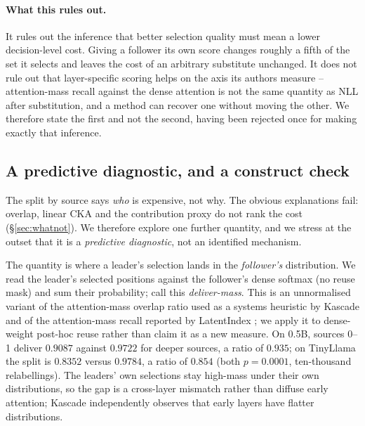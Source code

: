 \documentclass[10pt]{article}
\begin{document}
\paragraph{What this rules out.} It rules out the inference that better
selection quality must mean a lower decision-level cost. Giving a follower its
own score changes roughly a fifth of the set it selects and leaves the cost of
an arbitrary substitute unchanged. It does not rule out that layer-specific
scoring helps on the axis its authors measure -- attention-mass recall
against the dense attention is not the same quantity as NLL after
substitution, and a method can recover one without moving the other. We
therefore state the first and not the second, having been rejected once for
making exactly that inference.

\subsection{A predictive diagnostic, and a construct check}
\label{sec:mechanism}

The split by source says \emph{who} is expensive, not why. The obvious
explanations fail: overlap, linear CKA and the contribution proxy do not rank
the cost (\S\ref{sec:whatnot}). We therefore explore one further quantity, and
we stress at the outset that it is a \emph{predictive diagnostic}, not an
identified mechanism.

The quantity is where a leader's selection lands in the \emph{follower's}
distribution. We read the leader's selected positions against the follower's
dense softmax (no reuse mask) and sum their probability; call this
\emph{deliver-mass}. This is an unnormalised variant of the attention-mass
overlap ratio used as a systems heuristic by Kascade \citep{kascade} and of the
attention-mass recall reported by LatentIndex \citep{latentindex}; we apply it
to dense-weight post-hoc reuse rather than claim it as a new measure. On 0.5B,
sources 0--1 deliver $0.9087$ against $0.9722$ for deeper sources, a ratio of
$0.935$; on TinyLlama the split is $0.8352$ versus $0.9784$, a ratio of $0.854$
(both $p=0.0001$, ten-thousand relabellings). The leaders' own selections stay
high-mass under their own distributions, so the gap is a cross-layer mismatch
rather than diffuse early attention; Kascade \citep{kascade} independently
observes that early layers have flatter distributions.
\end{document}
